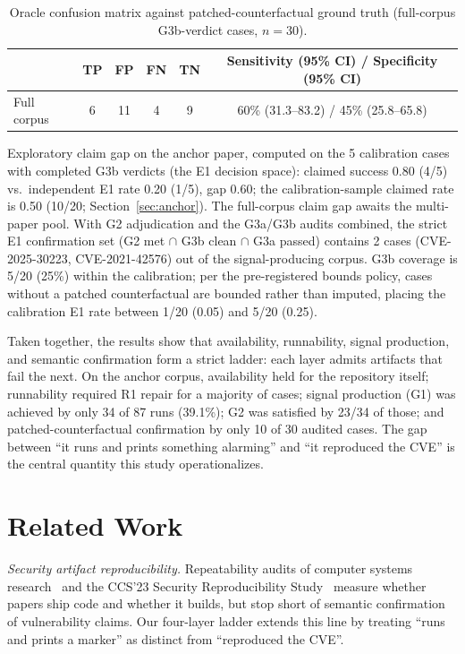 \documentclass[11pt]{article}
\begin{document}
\begin{table}[h]
\centering
\caption{Oracle confusion matrix against patched-counterfactual ground truth (full-corpus G3b-verdict cases, $n{=}30$).}
\label{tab:oracle-matrices}
\footnotesize
\begin{tabular}{@{}lccccc@{}}
\toprule
& TP & FP & FN & TN & Sensitivity (95\% CI) / Specificity (95\% CI) \\
\midrule
Full corpus & 6 & 11 & 4 & 9 &
  60\% (31.3--83.2) / 45\% (25.8--65.8) \\
\bottomrule
\end{tabular}
\end{table}

Exploratory claim gap on the anchor paper, computed on the 5 calibration cases with completed G3b verdicts (the E1 decision space): claimed success 0.80 (4/5) vs.\ independent E1 rate 0.20 (1/5), gap 0.60; the calibration-sample claimed rate is 0.50 (10/20; Section~\ref{sec:anchor}). The full-corpus claim gap awaits the multi-paper pool. With G2 adjudication and the G3a/G3b audits combined, the strict E1 confirmation set (G2 met $\cap$ G3b clean $\cap$ G3a passed) contains 2 cases (CVE-2025-30223, CVE-2021-42576) out of the signal-producing corpus. G3b coverage is 5/20 (25\%) within the calibration; per the pre-registered bounds policy, cases without a patched counterfactual are bounded rather than imputed, placing the calibration E1 rate between 1/20 (0.05) and 5/20 (0.25).

Taken together, the results show that availability, runnability, signal production, and semantic confirmation form a strict ladder: each layer admits artifacts that fail the next. On the anchor corpus, availability held for the repository itself; runnability required R1 repair for a majority of cases; signal production (G1) was achieved by only 34 of 87 runs (39.1\%); G2 was satisfied by 23/34 of those; and patched-counterfactual confirmation by only 10 of 30 audited cases. The gap between ``it runs and prints something alarming'' and ``it reproduced the CVE'' is the central quantity this study operationalizes.

\section{Related Work}
\label{sec:related}

\emph{Security artifact reproducibility.} Repeatability audits of computer systems research~\citep{collberg2016} and the CCS'23 Security Reproducibility Study~\citep{ccs23_repro} measure whether papers ship code and whether it builds, but stop short of semantic confirmation of vulnerability claims. Our four-layer ladder extends this line by treating ``runs and prints a marker'' as distinct from ``reproduced the CVE''.
\end{document}
